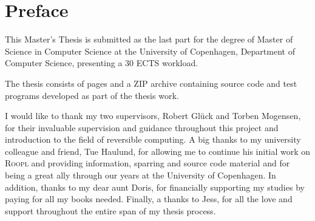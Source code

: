 \chapter*{Preface}

This Master's Thesis is submitted as the last part for the degree of Master of Science in Computer Science at the University of Copenhagen, Department of Computer Science, presenting a 30 ECTS workload.

The thesis consists of \pageref*{LastPage} pages and a ZIP archive containing source code and test programs developed as part of the thesis work.

I would like to thank my two supervisors, Robert Glück and Torben Mogensen, for their invaluable supervision and guidance throughout this project and introduction to the field of reversible computing. A big thanks to my university colleague and friend, Tue Haulund, for allowing me to continue his initial work on \textsc{Roopl} and providing information, sparring and source code material and for being a great ally through our years at the University of Copenhagen. In addition, thanks to my dear aunt Doris, for financially supporting my studies by paying for all my books needed. Finally, a thanks to Jess, for all the love and support throughout the entire span of my thesis process.
